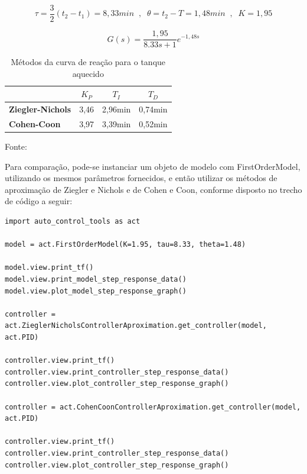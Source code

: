 \begin{equation}
    \label{eq:bib_comp_1_id}
    \tau = \frac{3}{2}(t_2 - t_1) = 8,33min \;\;,\;\; \theta = t_2 - T = 1,48min \;\;,\;\; K=1,95
\end{equation}

\begin{equation}
    \label{eq:bib_comp_1_model}
    G(s) = \frac{1,95}{8.33 s + 1}e^{-1,48 s}
\end{equation}

\begin{table}[h]
    \begin{center}
        \begin{tabular}{ | l | c | c | c | }
            \hline
            {}                         & {$K_P$} & {$T_I$}   & {$T_D$}   \\
            \hline
            {\textbf{Ziegler-Nichols}} & {3,46}  & {2,96min} & {0,74min} \\
            \hline
            {\textbf{Cohen-Coon}}      & {3,97}  & {3,39min} & {0,52min} \\
            \hline
        \end{tabular}
        \caption{ Métodos da curva de reação para o tanque aquecido}
        \vspace{0cm}\hspace{0cm}\small{Fonte: \cite{apostpidsint}}
        \label{tab:bib_comp_1_restb}
    \end{center}
\end{table}

Para comparação, pode-se instanciar um objeto de modelo com FirstOrderModel, utilizando os mesmos parâmetros fornecidos,
e então utilizar os métodos de aproximação de Ziegler e Nichols e de Cohen e Coon, conforme disposto no trecho de código
a seguir:
\begin{lstlisting}[label={lst:bib_comp_1_code1}]
import auto_control_tools as act

model = act.FirstOrderModel(K=1.95, tau=8.33, theta=1.48)

model.view.print_tf()
model.view.print_model_step_response_data()
model.view.plot_model_step_response_graph()

controller = act.ZieglerNicholsControllerAproximation.get_controller(model, act.PID)

controller.view.print_tf()
controller.view.print_controller_step_response_data()
controller.view.plot_controller_step_response_graph()

controller = act.CohenCoonControllerAproximation.get_controller(model, act.PID)

controller.view.print_tf()
controller.view.print_controller_step_response_data()
controller.view.plot_controller_step_response_graph()
\end{lstlisting}

